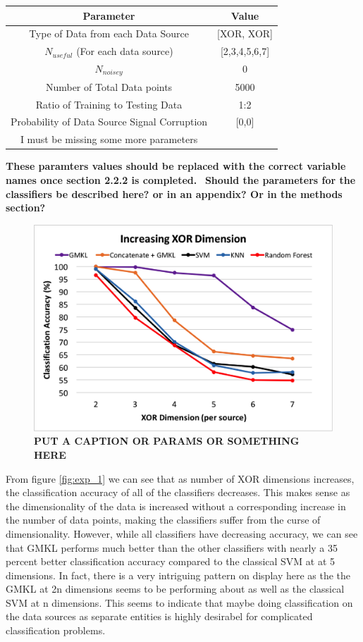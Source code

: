 \documentclass{article}
\begin{document}
\begin{table}
\centering
\begin{tabular}{|c c|}
\hline
Parameter & Value \\
\hline
Type of Data from each Data Source & [XOR, XOR]\\
$N_{useful}$ (For each data source) & [2,3,4,5,6,7] \\
$N_{noisey}$& 0\\
Number of Total Data points & 5000\\
Ratio of Training to Testing Data & 1:2\\
Probability of Data Source Signal Corruption & [0,0]\\
I must be missing some more parameters\\
\hline
 \end{tabular}
\end{table}

\textbf{These paramters values should be replaced with the correct variable names once section 2.2.2 is completed. }\
\textbf{Should the parameters for the classifiers be described here? or in an appendix? Or in the methods section? }

\begin{figure}
\centering
\includegraphics[scale=0.4]{experimentpic1.png}
\caption{\textbf{PUT A CAPTION OR PARAMS OR SOMETHING HERE}}
\label{fig:exp_1.png}
\end{figure}


From figure \ref{fig:exp_1} we can see that as number of XOR dimensions increases, the classification accuracy of all of the classifiers decreases. This makes sense as the dimensionality of the data is increased without a corresponding increase in the number of data points, making the classifiers suffer from the curse of dimensionality. However, while all classifiers have decreasing accuracy, we can see that GMKL performs much better than the other classifiers with nearly a 35 percent better classification accuracy compared to the classical SVM at at 5 dimensions. In fact, there is a very intriguing pattern on display here as the the GMKL at 2n dimensions seems to be performing about as well as the classical SVM at n dimensions. This seems to indicate that maybe doing classification on the data sources as separate entities is highly desirabel for complicated classification problems.
\end{document}
